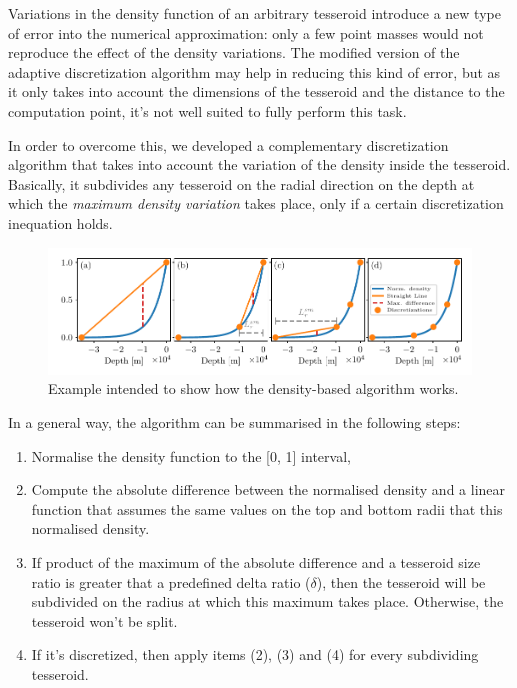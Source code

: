 \documentclass[extra]{gji}
\begin{document}
Variations in the density function of an arbitrary tesseroid introduce
a new type of error into the numerical approximation: only a few point
masses would not reproduce the effect of the density variations.
The modified version of the adaptive discretization algorithm may help
in reducing this kind of error, but as it only takes into account the
dimensions of the tesseroid and the distance to the computation point,
it's not well suited to fully perform this task.

In order to overcome this, we developed a complementary discretization
algorithm that takes into account the variation of the density inside
the tesseroid.
Basically, it subdivides any tesseroid on the radial direction on the
depth at which the \emph{maximum density variation} takes place, only
if a certain discretization inequation holds.

\begin{figure}
\centering
\includegraphics[width=\linewidth]
    {figures/density-based-discretization-algorithm.pdf}
\caption{
    Example intended to show how the density-based algorithm works.}
\label{fig:density-discretization-algorithm}
\end{figure}

In a general way, the algorithm can be summarised in the following steps:

\begin{enumerate}
\renewcommand{\theenumi}{(\arabic{enumi})}
    \item Normalise the density function to the [0, 1] interval,
    \item Compute the absolute difference between the normalised
          density and a linear function that assumes the same values on the
          top and bottom radii that this normalised density.
    \item If product of the maximum of the absolute difference and a
          tesseroid size ratio is greater that a predefined delta ratio
          ($\delta$), then the tesseroid will be subdivided on the
          radius at which this maximum takes place. Otherwise, the
          tesseroid won't be split.
    \item If it's discretized, then apply items (2), (3) and (4) for
          every subdividing tesseroid.
\end{enumerate}
\end{document}
